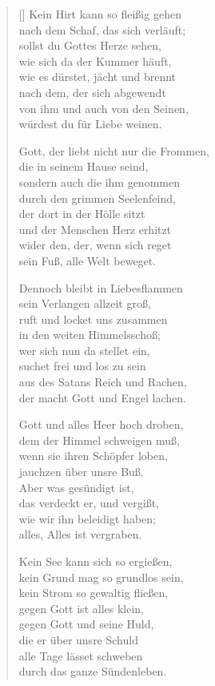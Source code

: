 \begin{multicols}{2}
\begin{verse}[\versewidth]
 Kein Hirt kann so fleißig gehen\\
nach dem Schaf, das sich verläuft;\\
sollst du Gottes Herze sehen,\\
wie sich da der Kummer häuft,\\
wie es dürstet, jächt und brennt\\
nach dem, der sich abgewendt\\
von ihm und auch von den Seinen,\\
würdest du für Liebe weinen.

 Gott, der liebt nicht nur die Frommen,\\
die in seinem Hause seind,\\
sondern auch die ihm genommen\\
durch den grimmen Seelenfeind,\\
der dort in der Hölle sitzt\\
und der Menschen Herz erhitzt\\
wider den, der, wenn sich reget\\
sein Fuß, alle Welt beweget.

 Dennoch bleibt in Liebesflammen\\
sein Verlangen allzeit groß,\\
ruft und locket uns zusammen\\
in den weiten Himmelsschoß;\\
wer sich nun da stellet ein,\\
suchet frei und los zu sein\\
aus des Satans Reich und Rachen,\\
der macht Gott und Engel lachen.

 Gott und alles Heer hoch droben,\\
dem der Himmel schweigen muß,\\
wenn sie ihren Schöpfer loben,\\
jauchzen über unsre Buß.\\
Aber was gesündigt ist,\\
das verdeckt er, und vergißt,\\
wie wir ihn beleidigt haben;\\
alles, Alles ist vergraben.

 Kein See kann sich so ergießen,\\
kein Grund mag so grundlos sein,\\
kein Strom so gewaltig fließen,\\
gegen Gott ist alles klein,\\
gegen Gott und seine Huld,\\
die er über unsre Schuld\\
alle Tage lässet schweben\\
durch das ganze Sündenleben.


\end{verse}
\end{multicols}
